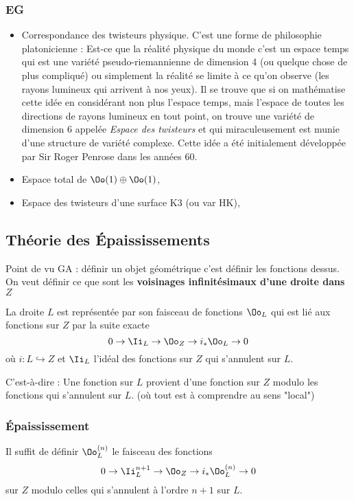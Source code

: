 \documentclass[a4paper]{amsart}
\begin{document}
\subsubsection{EG}
\label{sec:org3aaf1bb}
\begin{itemize}
\item Correspondance des twisteurs physique.
C'est une forme de philosophie platonicienne : Est-ce que la réalité physique du monde c'est un espace temps qui est une variété pseudo-riemannienne de dimension 4 (ou quelque chose de plus compliqué) ou simplement la réalité se limite à ce qu'on observe (les rayons lumineux qui arrivent à nos yeux). Il se trouve que si on mathématise cette idée en considérant non plus l'espace temps, mais l'espace de toutes les directions de rayons lumineux en tout point, on trouve une variété de dimension \(6\) appelée \emph{Espace des twisteurs} et qui miraculeusement est munie d'une structure de variété complexe. Cette idée a été initialement développée par Sir Roger Penrose dans les années 60.

\item Espace total de \(\Oo(1) \oplus \Oo(1)\),

\item Espace des twisteurs d'une surface K3 (ou var HK),
\end{itemize}


\subsection{Théorie des Épaississements}
\label{sec:org26c48a0}
Point de vu GA : définir un objet géométrique c'est définir les fonctions dessus. On veut définir ce que sont les \textbf{voisinages infinitésimaux d'une droite dans \(Z\)}

La droite \(L\) est représentée par son faisceau de fonctions \(\Oo_L\) qui est lié aux fonctions sur \(Z\) par la suite exacte
\[
0 \to \Ii_L \to \Oo_Z \to i_* \Oo_L \to 0
\]
où \(i : L \hookrightarrow Z\) et \(\Ii_L\) l'idéal des fonctions sur \(Z\) qui s'annulent sur \(L\).

C'est-à-dire : Une fonction sur \(L\) provient d'une fonction sur \(Z\) modulo les fonctions qui s'annulent sur \(L\). (où tout est à comprendre au sens "local")

\subsubsection{Épaississement}
\label{sec:org93112e4}
Il suffit de définir \(\Oo_L^{(n)}\) le faisceau des fonctions
\[
0 \to \Ii^{n+1}_L \to \Oo_Z \to i_* \Oo_L^{(n)} \to 0
\]
sur \(Z\) modulo celles qui s'annulent à l'ordre \(n+1\) sur \(L\).
\end{document}
